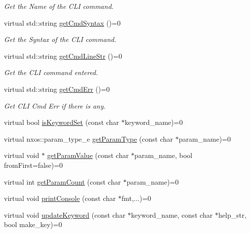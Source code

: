 \begin{DoxyCompactItemize}
\begin{DoxyCompactList}\small\item\em Get the Name of the CLI command. \item\end{DoxyCompactList}\item 
\hypertarget{classnxos_1_1NxCliCmd_a0568d5404d91ddb89135e632e05d7abe}{
virtual std::string \hyperlink{classnxos_1_1NxCliCmd_a0568d5404d91ddb89135e632e05d7abe}{getCmdSyntax} ()=0}
\label{classnxos_1_1NxCliCmd_a0568d5404d91ddb89135e632e05d7abe}

\begin{DoxyCompactList}\small\item\em Get the Syntax of the CLI command. \item\end{DoxyCompactList}\item 
\hypertarget{classnxos_1_1NxCliCmd_a3d856a7d4350f027df53960053901c96}{
virtual std::string \hyperlink{classnxos_1_1NxCliCmd_a3d856a7d4350f027df53960053901c96}{getCmdLineStr} ()=0}
\label{classnxos_1_1NxCliCmd_a3d856a7d4350f027df53960053901c96}

\begin{DoxyCompactList}\small\item\em Get the CLI command entered. \item\end{DoxyCompactList}\item 
\hypertarget{classnxos_1_1NxCliCmd_aa4321d9b60ecb1366157d0ef9356ffbf}{
virtual std::string \hyperlink{classnxos_1_1NxCliCmd_aa4321d9b60ecb1366157d0ef9356ffbf}{getCmdErr} ()=0}
\label{classnxos_1_1NxCliCmd_aa4321d9b60ecb1366157d0ef9356ffbf}

\begin{DoxyCompactList}\small\item\em Get CLI Cmd Err if there is any. \item\end{DoxyCompactList}\item 
virtual bool \hyperlink{classnxos_1_1NxCliCmd_af100c6495c0e383c8e3d11d5cdb68cd2}{isKeywordSet} (const char $\ast$keyword\_\-name)=0
\item 
virtual nxos::param\_\-type\_\-e \hyperlink{classnxos_1_1NxCliCmd_ab3722b567439f8ebd6422a5727bb7af6}{getParamType} (const char $\ast$param\_\-name)=0
\item 
virtual void $\ast$ \hyperlink{classnxos_1_1NxCliCmd_a827bd696ec228767cb1f6dbfdbbd271c}{getParamValue} (const char $\ast$param\_\-name, bool fromFirst=false)=0
\item 
virtual int \hyperlink{classnxos_1_1NxCliCmd_a12e56ced4646ba1a27417030c0d20e7b}{getParamCount} (const char $\ast$param\_\-name)=0
\item 
virtual void \hyperlink{classnxos_1_1NxCliCmd_a10c723c79d75ac2c85821b5ca6540c62}{printConsole} (const char $\ast$fmt,...)=0
\item 
virtual void \hyperlink{classnxos_1_1NxCliCmd_ae1669d9fbeaa164494a503379ca52b86}{updateKeyword} (const char $\ast$keyword\_\-name, const char $\ast$help\_\-str, bool make\_\-key)=0
\end{DoxyCompactItemize}


